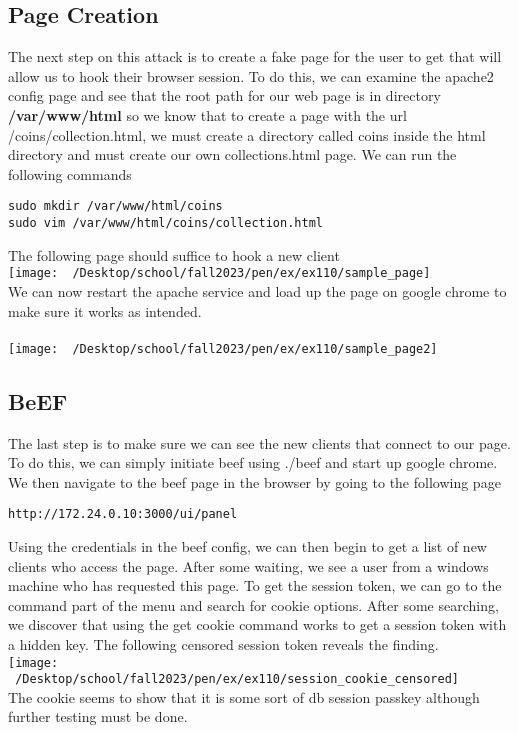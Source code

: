 \documentclass[notitlepage]{article}
\begin{document}
    \subsection{Page Creation}
    The next step on this attack is to create a fake page for the user to get that will allow us to hook
    their browser session. To do this, we can examine the apache2 config page and see that the root path 
    for our web page is in directory \textbf{/var/www/html} so we know that to create a page with 
    the url /coins/collection.html, we must create a directory called coins inside the html directory
    and must create our own collections.html page. We can run the following commands 
\begin{verbatim}
sudo mkdir /var/www/html/coins
sudo vim /var/www/html/coins/collection.html
\end{verbatim}
    The following page should suffice to hook a new client \\
\texttt{[image: ~/Desktop/school/fall2023/pen/ex/ex110/sample\_page]}\\
    We can now restart the apache service and load up the page on google chrome to make sure it works
    as intended. \\~\\
\texttt{[image: ~/Desktop/school/fall2023/pen/ex/ex110/sample\_page2]}\\


    \subsection{BeEF}
    The last step is to make sure we can see the new clients that connect to our page. To do this, we
    can simply initiate beef using ./beef and start up google chrome. We then navigate to the beef page
    in the browser by going to the following page
    \begin{verbatim}
http://172.24.0.10:3000/ui/panel 
   \end{verbatim}
   Using the credentials in the beef config, we can then begin to get a list of new clients who access
   the page. After some waiting, we see a user from a windows machine who has requested this page. To
   get the session token, we can go to the command part of the menu and search for cookie options. After
   some searching, we discover that using the get cookie command works to get a session token with a hidden
   key. The following censored session token reveals the finding. \\
\texttt{[image: ~/Desktop/school/fall2023/pen/ex/ex110/session\_cookie\_censored]}\\
    The cookie seems to show that it is some sort of db session passkey although further testing must
    be done.
\end{document}
